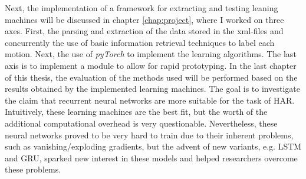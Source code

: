 	Next, the implementation of a framework for extracting and testing leaning machines will be discussed in chapter \ref{chap:project}, where I worked on three axes. First, the parsing and extraction of the data stored in the xml-files and concurrently the use of basic information retrieval techniques to label each motion. Next, the use of \textit{pyTorch} to implement the learning algorithms. The last axis is to implement a module to allow for rapid prototyping.\newline
	In the last chapter of this thesis, the evaluation of the methods used will be performed based on the results obtained by the implemented learning machines. The goal is to investigate the claim that recurrent neural networks are more suitable for the task of HAR. Intuitively, these learning machines are the best fit, but the worth of the additional computational overhead is very questionable. Nevertheless, these neural networks proved to be very hard to train due to their inherent problems, such as vanishing/exploding gradients, but the advent of new variants, e.g. LSTM and GRU, sparked new interest in these models and helped researchers overcome these problems.
